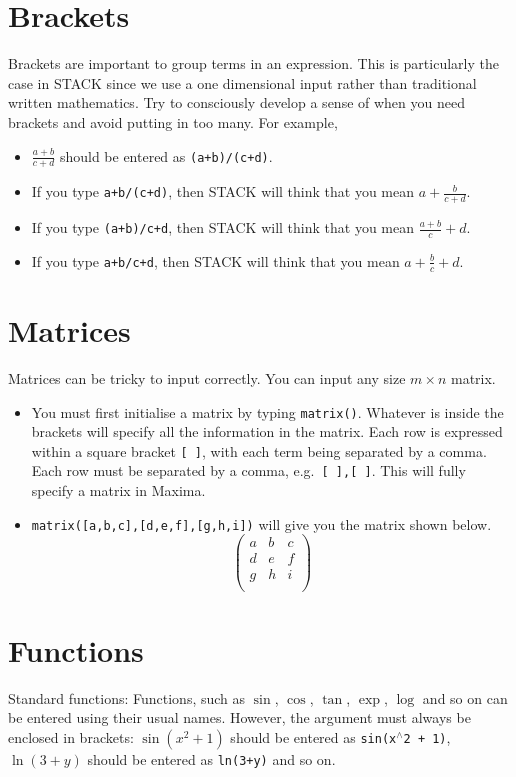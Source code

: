 \documentclass[a4paper]{article}
\newcommand{\stack}[1]{{\color{red}\tt #1}}
\begin{document}
\begin{multicols}{2}
\section*{Brackets}
Brackets are important to group terms in an expression. This is particularly the case in STACK since we use a one dimensional input rather than traditional written mathematics. Try to consciously develop a sense of when you need brackets and avoid putting in too many. For example,
\begin{itemize}
\item $\frac{a+b}{c+d}$ should be entered as \stack{(a+b)/(c+d)}.
\item If you type \stack{a+b/(c+d)}, then STACK will think that you mean $a + \frac{b}{c+d}$.
\item If you type \stack{(a+b)/c+d}, then STACK will think that you mean $\frac{a+b}{c} + d$.
\item If you type \stack{a+b/c+d}, then STACK will think that you mean $a + \frac{b}{c} + d$.
\end{itemize}

\section*{Matrices}
Matrices can be tricky to input correctly. You can input any size $m\times n$ matrix.
\begin{itemize}
\item You must first initialise a matrix by typing \stack{matrix()}. Whatever is inside the brackets will specify all the information in the matrix. Each row is expressed within a square bracket \stack{[ ]}, with each term being separated by a comma. Each row must be separated by a comma, e.g.~\stack{[ ],[ ]}. This will fully specify a matrix in Maxima.
\item \stack{matrix([a,b,c],[d,e,f],[g,h,i])} will give you the matrix shown below.
\begin{displaymath}
\left( \begin{array}{ccc} a & b & c \\ d & e & f \\ g & h & i \\ \end{array} \right)
\end{displaymath}
\end{itemize}
\section*{Functions}
Standard functions: Functions, such as $\sin$, $\cos$, $\tan$, $\exp$, $\log$ and so on can be entered using their usual names. However, the argument must always be enclosed in brackets: $\sin{(x^2 + 1)}$ should be entered as \stack{sin(x$^{\wedge}$2 + 1)}, $\ln{(3+y)}$ should be entered as \stack{ln(3+y)} and so on.


\end{multicols}
\end{document}
